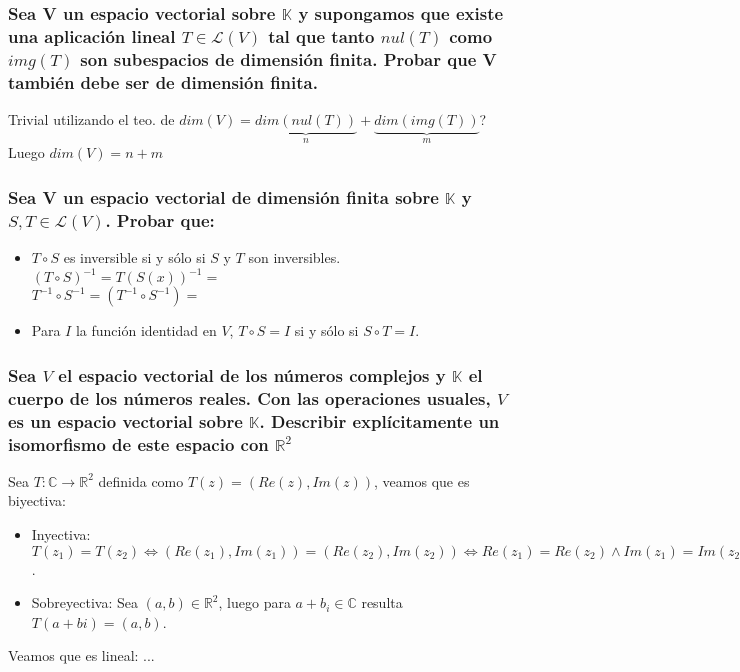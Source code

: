 \documentclass{article}
\begin{document}
\subsubsection{Sea V un espacio vectorial sobre $\mathbb{K}$ y supongamos que existe una aplicación lineal
$T \in \mathcal{L}(V)$ tal que tanto $nul(T)$ como $img(T)$ son subespacios de dimensión finita. Probar que V
también debe ser de dimensión finita.}
Trivial utilizando el teo. de $dim(V) = \underbrace{dim(nul(T))}_{n}+\underbrace{dim(img(T))}_{m}$?
\\ Luego $dim(V)=n+m$

\subsubsection{Sea V un espacio vectorial de dimensión finita sobre $\mathbb{K}$ y $S,T \in \mathcal{L}(V)$. Probar que:}
\begin{itemize}
	\item
		$T \circ S$ es inversible si y sólo si $S$ y $T$ son inversibles.
		\\ $(T \circ S)^{-1} = T(S(x))^{-1} = $
		\\ $T^{-1} \circ S^{-1} = (T^{-1}\circ S^{-1}) =   $
	\item
		Para $I$ la función identidad en $V$, $T \circ S = I$ si y sólo si $S \circ T=I$.
\end{itemize}

\subsubsection{Sea $V$ el espacio vectorial de los números complejos y $\mathbb{K}$ el cuerpo de los números
reales. Con las operaciones usuales, $V$ es un espacio vectorial sobre $\mathbb{K}$. Describir explícitamente
un isomorfismo de este espacio con $\mathbb{R}^2$}

Sea $T: \mathbb{C} \rightarrow \mathbb{R}^2$ definida como $T(z) = (Re(z),Im(z))$, veamos que es biyectiva:
\begin{itemize}
	\item
		Inyectiva: $T(z_1)=T(z_2) \Longleftrightarrow (Re(z_1),Im(z_1)) = (Re(z_2),Im(z_2)) \Longleftrightarrow
		Re(z_1) = Re(z_2) \wedge Im(z_1) = Im(z_2) \Longleftrightarrow z_1=z_2$.
	\item
		Sobreyectiva: Sea $(a,b) \in \mathbb{R}^2$, luego para $a+b_i \in \mathbb{C}$ resulta
		$T(a+bi)=(a,b)$.
\end{itemize}
Veamos que es lineal: ... \\
\end{document}
